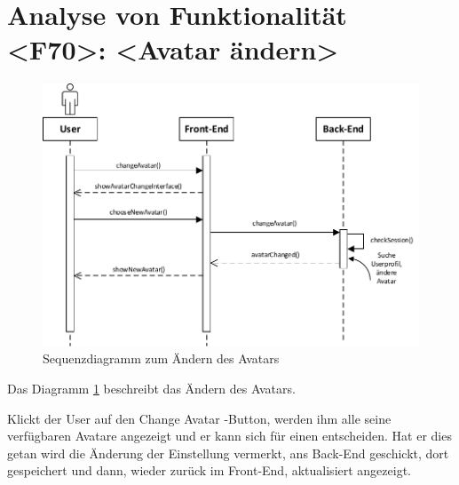 \newpage
\section{Analyse von Funktionalität <F70>: <Avatar ändern>} 
\begin{figure}[h]
\centering
\includegraphics[width=1\textwidth]{figures/sequenz_F70.pdf}
\caption{Sequenzdiagramm zum Ändern des Avatars}
\label{sequence_f70}
\end{figure}
Das Diagramm \ref{sequence_f70} beschreibt das Ändern des Avatars.

Klickt der User auf den \glqq Change Avatar \grqq -Button, werden ihm alle seine verfügbaren Avatare angezeigt und er kann sich für einen entscheiden. Hat er dies getan wird die Änderung der Einstellung vermerkt, ans Back-End geschickt, dort gespeichert und dann, wieder zurück im Front-End, aktualisiert angezeigt.

\newpage
